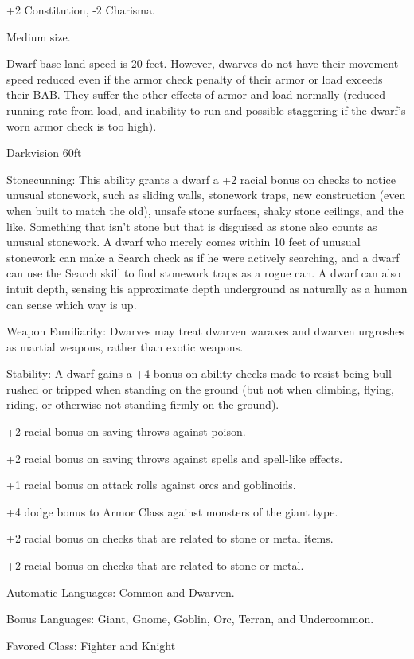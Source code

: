 

\begin{itemize*}
\item +2 Constitution, -2 Charisma.
\item Medium size.
\item Dwarf base land speed is 20 feet. However, dwarves do not have their movement speed reduced even if the armor check penalty of their armor or load exceeds their BAB. They suffer the other effects of armor and load normally (reduced running rate from load, and inability to run and possible staggering if the dwarf's worn armor check is too high).
\item Darkvision 60ft
\item Stonecunning: This ability grants a dwarf a +2 racial bonus on  checks to notice unusual stonework, such as sliding walls, stonework traps, new construction (even when built to match the old), unsafe stone surfaces, shaky stone ceilings, and the like. Something that isn't stone but that is disguised as stone also counts as unusual stonework. A dwarf who merely comes within 10 feet of unusual stonework can make a Search check as if he were actively searching, and a dwarf can use the Search skill to find stonework traps as a rogue can. A dwarf can also intuit depth, sensing his approximate depth underground as naturally as a human can sense which way is up.
\item Weapon Familiarity: Dwarves may treat dwarven waraxes and dwarven urgroshes as martial weapons, rather than exotic weapons.
\item Stability: A dwarf gains a +4 bonus on ability checks made to resist being bull rushed or tripped when standing on the ground (but not when climbing, flying, riding, or otherwise not standing firmly on the ground).
\item +2 racial bonus on saving throws against poison.
\item +2 racial bonus on saving throws against spells and spell-like effects.
\item +1 racial bonus on attack rolls against orcs and goblinoids.
\item +4 dodge bonus to Armor Class against monsters of the giant type.
\item +2 racial bonus on  checks that are related to stone or metal items.
\item +2 racial bonus on  checks that are related to stone or metal.
\item Automatic Languages: Common and Dwarven.
\item Bonus Languages: Giant, Gnome, Goblin, Orc, Terran, and Undercommon.
\item Favored Class: Fighter and Knight
\end{itemize*}